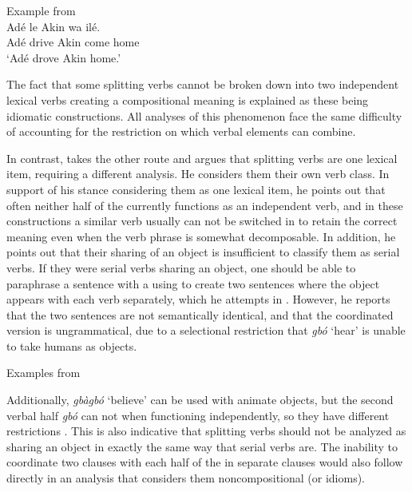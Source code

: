 \documentclass[output=paper]{LSP/langsci}
\begin{document}
    \ex Example from \citet{Sebba1987} \\
    \gll Ad\'{e} le Akin wa il\'{e}.\\
    Ad\'{e} drive Akin come home\\
    \glt `Ad\'{e} drove Akin home.'
 \z
 \label{ex:parrish:serial-verb-examples} 
\z


The fact that some splitting verbs cannot be broken down into two independent lexical verbs creating a compositional meaning is explained as these being idiomatic constructions. All analyses of this phenomenon face the same difficulty of accounting for the restriction on which verbal elements can combine.

In contrast, \citet{Awobuluyi1967,Awobuluyi1971} takes the other route and argues that splitting verbs are one lexical item, requiring a different analysis. He considers them their own verb class. In support of his stance considering them as one lexical item, he points out that often neither half of the  currently functions as an independent verb, and in these constructions a similar verb usually can not be switched in to retain the correct meaning even when the verb phrase is somewhat decomposable. In addition, he points out that their sharing of an object is insufficient to classify them as serial verbs. If they were serial verbs sharing an object, one should be able to paraphrase a sentence with a  using  to create two sentences where the object appears with each verb separately, which he attempts in . However, he reports that the two sentences are not semantically identical, and that the coordinated version is ungrammatical, due to a selectional restriction that \textit{gb\'{o}} `hear' is unable to take humans as objects.
 
\ea Examples from \citet{Awobuluyi1967} 

	\z
\label{ex:parrish:coordination}
\z 

Additionally, \textit{gb\`{a}gb\'{o}} `believe' can be used with animate objects, but the second verbal half \textit{gb\'{o}} can not when functioning independently, so they have different  restrictions \citep{Awobuluyi1967}. This is also indicative that splitting verbs should not be analyzed as sharing an object in exactly the same way that serial verbs are. The inability to coordinate two clauses with each half of the  in separate clauses would also follow directly in an analysis that considers them noncompositional (or idioms).
\end{document}
